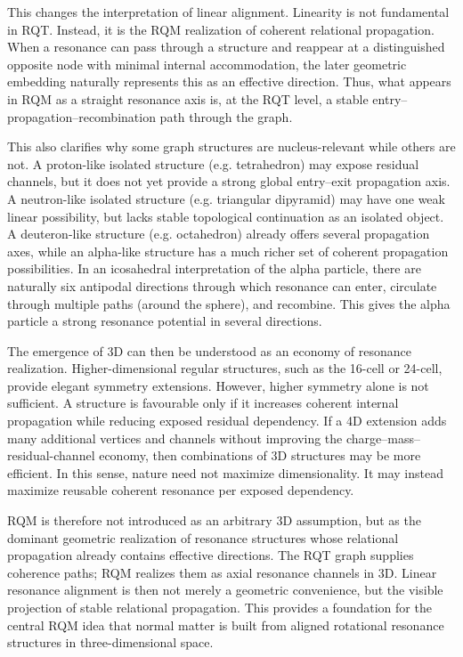 \documentclass[11pt,a4paper]{article}
\begin{document}
This changes the interpretation of linear alignment. Linearity is not fundamental in RQT. Instead, it is the RQM realization of coherent relational propagation. When a resonance can pass through a structure and reappear at a distinguished opposite node with minimal internal accommodation, the later geometric embedding naturally represents this as an effective direction. Thus, what appears in RQM as a straight resonance axis is, at the RQT level, a stable entry–propagation–recombination path through the graph.

This also clarifies why some graph structures are nucleus-relevant while others are not. A proton-like isolated structure (e.g. tetrahedron) may expose residual channels, but it does not yet provide a strong global entry–exit propagation axis. A neutron-like isolated structure (e.g. triangular dipyramid) may have one weak linear possibility, but lacks stable topological continuation as an isolated object. A deuteron-like structure (e.g. octahedron) already offers several propagation axes, while an alpha-like structure has a much richer set of coherent propagation possibilities. In an icosahedral interpretation of the alpha particle, there are naturally six antipodal directions through which resonance can enter, circulate through multiple paths (around the sphere), and recombine. This gives the alpha particle a strong resonance potential in several directions.

The emergence of 3D can then be understood as an economy of resonance realization. Higher-dimensional regular structures, such as the 16-cell or 24-cell, provide elegant symmetry extensions. However, higher symmetry alone is not sufficient. A structure is favourable only if it increases coherent internal propagation while reducing exposed residual dependency. If a 4D extension adds many additional vertices and channels without improving the charge–mass–residual-channel economy, then combinations of 3D structures may be more efficient. In this sense, nature need not maximize dimensionality. It may instead maximize reusable coherent resonance per exposed dependency.

RQM is therefore not introduced as an arbitrary 3D assumption, but as the dominant geometric realization of resonance structures whose relational propagation already contains effective directions. The RQT graph supplies coherence paths; RQM realizes them as axial resonance channels in 3D. Linear resonance alignment is then not merely a geometric convenience, but the visible projection of stable relational propagation. This provides a foundation for the central RQM idea that normal matter is built from aligned rotational resonance structures in three-dimensional space.
\end{document}
